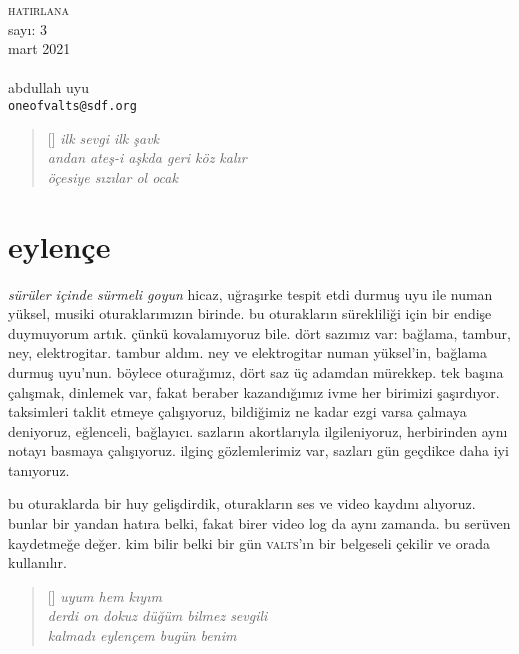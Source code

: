 \documentclass[9pt, a5paper, twocolumn, openright]{memoir}
\begin{document}
\thispagestyle{plain}
\noindent
{\HUGE\textsc{hatirlana}\\\small{}sayı: 3\\mart 2021}\\\\
{\small{}abdullah uyu\\\texttt{oneofvalts@sdf.org}}
\bigskip
{}
\begin{verse}[\versewidth]
  \itshape{}
  ilk sevgi ilk şavk\\
  andan ateş-i aşkda geri köz kalır\\
  öçesiye sızılar ol ocak
\end{verse}
\section{eylençe}
\textit{sürüler içinde sürmeli goyun} hicaz, uğraşırke tespit etdi durmuş
uyu ile numan yüksel, musiki oturaklarımızın birinde. bu oturakların
sürekliliği için bir endişe duymuyorum artık. çünkü kovalamıyoruz bile.
dört sazımız var: bağlama, tambur, ney, elektrogitar. tambur aldım. ney
ve elektrogitar numan yüksel'in, bağlama durmuş uyu'nun. böylece
oturağımız, dört saz üç adamdan mürekkep. tek başına çalışmak, dinlemek
var, fakat beraber kazandığımız ivme her birimizi şaşırdıyor. taksimleri
taklit etmeye çalışıyoruz, bildiğimiz ne kadar ezgi varsa çalmaya
deniyoruz, eğlenceli, bağlayıcı. sazların akortlarıyla ilgileniyoruz,
herbirinden aynı notayı basmaya çalışıyoruz. ilginç gözlemlerimiz var,
sazları gün geçdikce daha iyi tanıyoruz.

bu oturaklarda bir huy gelişdirdik, oturakların ses ve video
kaydını alıyoruz. bunlar bir yandan hatıra belki, fakat birer video log da
aynı zamanda. bu serüven kaydetmeğe değer. kim bilir belki bir gün
\textsc{valts}'ın bir belgeseli çekilir ve orada kullanılır.
\begin{verse}[\versewidth]
  \itshape{}
  uyum hem kıyım\\
  derdi on dokuz düğüm bilmez sevgili\\
  kalmadı eylençem bugün benim
\end{verse}
\end{document}
